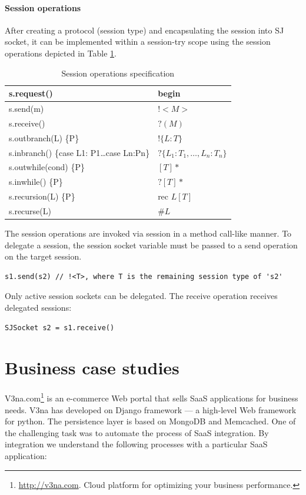 \documentclass{llncs}
\begin{document}
\paragraph{Session operations}
After creating a protocol (session type) and encapsulating the session into SJ socket, it can be implemented within a session-try scope using the session operations depicted in Table \ref{tab:session-ops}.

\begin{longtable}{|p{}|p{}|}
\caption{Session operations specification}\label{tab:session-ops}\\ \hline
s.request() & begin \\ \hline 
s.send(m) & $!<M>$ \\ \hline
s.receive() & $?(M)$ \\ \hline
s.outbranch(L) \{P\} & $!\{L:T\}$ \\ \hline
s.inbranch() \{case L1: {P1}\dots case Ln:{Pn}\} & $?\{L_1:T_1,\dots, L_n:T_n\}$ \\ \hline
s.outwhile(cond) \{P\} & $[T]*$ \\ \hline
s.inwhile() \{P\} & $?[T]*$ \\ \hline
s.recursion(L) \{P\} & rec $L[T]$ \\ \hline
s.recurse(L) & $\#L$ \\ \hline
\end{longtable}

The session operations are invoked via session in a method call-like manner. To delegate a session, the session socket variable must be passed to a send operation on the target session.

\begin{lstlisting}
s1.send(s2) // !<T>, where T is the remaining session type of 's2'
\end{lstlisting}


Only active session sockets can be delegated. The receive operation receives delegated sessions:

\begin{lstlisting}
SJSocket s2 = s1.receive()
\end{lstlisting}

\section{Business case studies}
\label{sect:impl}

V3na.com\footnote{\url{http://v3na.com}. Cloud platform for optimizing your business performance.}
is an e-commerce Web portal that sells SaaS applications for business needs. V3na has developed on Django framework --- a high-level Web framework for python. %
The persistence layer is based on MongoDB and Memcached. One of the challenging task was to automate the process of SaaS integration. By integration we understand the following processes with a particular SaaS application:
\end{document}

